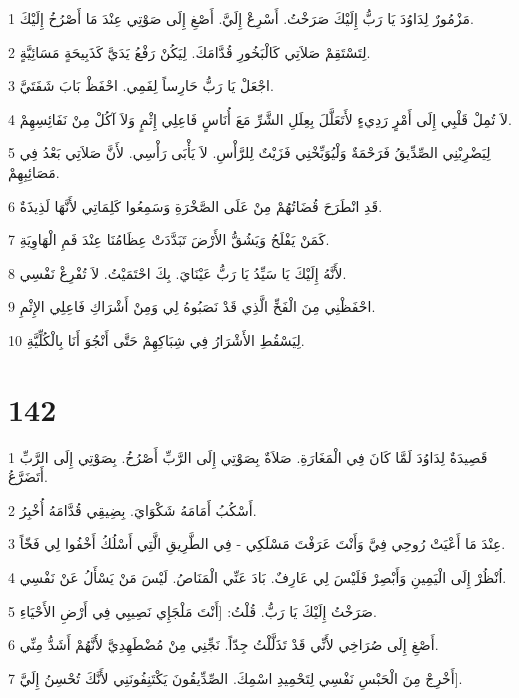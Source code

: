 \par 1 مَزْمُورٌ لِدَاوُدَ يَا رَبُّ إِلَيْكَ صَرَخْتُ. أَسْرِعْ إِلَيَّ. أَصْغِ إِلَى صَوْتِي عِنْدَ مَا أَصْرُخُ إِلَيْكَ.
\par 2 لِتَسْتَقِمْ صَلاَتِي كَالْبَخُورِ قُدَّامَكَ. لِيَكُنْ رَفْعُ يَدَيَّ كَذَبِيحَةٍ مَسَائِيَّةٍ.
\par 3 اجْعَلْ يَا رَبُّ حَارِساً لِفَمِي. احْفَظْ بَابَ شَفَتَيَّ.
\par 4 لاَ تُمِلْ قَلْبِي إِلَى أَمْرٍ رَدِيءٍ لأَتَعَلَّلَ بِعِلَلِ الشَّرِّ مَعَ أُنَاسٍ فَاعِلِي إِثْمٍ وَلاَ آكُلْ مِنْ نَفَائِسِهِمْ.
\par 5 لِيَضْرِبْنِي الصِّدِّيقُ فَرَحْمَةٌ وَلْيُوَبِّخْنِي فَزَيْتٌ لِلرَّأْسِ. لاَ يَأْبَى رَأْسِي. لأَنَّ صَلاَتِي بَعْدُ فِي مَصَائِبِهِمْ.
\par 6 قَدِ انْطَرَحَ قُضَاتُهُمْ مِنْ عَلَى الصَّخْرَةِ وَسَمِعُوا كَلِمَاتِي لأَنَّهَا لَذِيذَةٌ.
\par 7 كَمَنْ يَفْلَحُ وَيَشُقُّ الأَرْضَ تَبَدَّدَتْ عِظَامُنَا عِنْدَ فَمِ الْهَاوِيَةِ.
\par 8 لأَنَّهُ إِلَيْكَ يَا سَيِّدُ يَا رَبُّ عَيْنَايَ. بِكَ احْتَمَيْتُ. لاَ تُفْرِغْ نَفْسِي.
\par 9 احْفَظْنِي مِنَ الْفَخِّ الَّذِي قَدْ نَصَبُوهُ لِي وَمِنْ أَشْرَاكِ فَاعِلِي الإِثْمِ.
\par 10 لِيَسْقُطِ الأَشْرَارُ فِي شِبَاكِهِمْ حَتَّى أَنْجُوَ أَنَا بِالْكُلِّيَّةِ.

\chapter{142}

\par 1 قَصِيدَةٌ لِدَاوُدَ لَمَّا كَانَ فِي الْمَغَارَةِ. صَلاَةٌ بِصَوْتِي إِلَى الرَّبِّ أَصْرُخُ. بِصَوْتِي إِلَى الرَّبِّ أَتَضَرَّعُ.
\par 2 أَسْكُبُ أَمَامَهُ شَكْوَايَ. بِضِيقِي قُدَّامَهُ أُخْبِرُ.
\par 3 عِنْدَ مَا أَعْيَتْ رُوحِي فِيَّ وَأَنْتَ عَرَفْتَ مَسْلَكِي - فِي الطَّرِيقِ الَّتِي أَسْلُكُ أَخْفُوا لِي فَخّاً.
\par 4 اُنْظُرْ إِلَى الْيَمِينِ وَأَبْصِرْ فَلَيْسَ لِي عَارِفٌ. بَادَ عَنِّي الْمَنَاصُ. لَيْسَ مَنْ يَسْأَلُ عَنْ نَفْسِي.
\par 5 صَرَخْتُ إِلَيْكَ يَا رَبُّ. قُلْتُ: [أَنْتَ مَلْجَإِي نَصِيبِي فِي أَرْضِ الأَحْيَاءِ.
\par 6 أَصْغِ إِلَى صُرَاخِي لأَنِّي قَدْ تَذَلَّلْتُ جِدّاً. نَجِّنِي مِنْ مُضْطَهِدِيَّ لأَنَّهُمْ أَشَدُّ مِنِّي.
\par 7 أَخْرِجْ مِنَ الْحَبْسِ نَفْسِي لِتَحْمِيدِ اسْمِكَ. الصِّدِّيقُونَ يَكْتَنِفُونَنِي لأَنَّكَ تُحْسِنُ إِلَيَّ].

